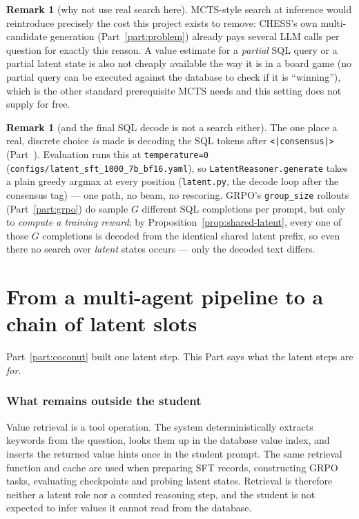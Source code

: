 \documentclass[11pt]{article}
\theoremstyle{definition}
\newtheorem{remark}[theorem]{Remark}
\begin{document}
\begin{remark}[why not use real search here]
MCTS-style search at inference would reintroduce precisely the cost this project exists to remove: CHESS's own multi-candidate generation (Part~\ref{part:problem}) already pays several LLM calls per question for exactly this reason. A value estimate for a \emph{partial} SQL query or a partial latent state is also not cheaply available the way it is in a board game (no partial query can be executed against the database to check if it is ``winning''), which is the other standard prerequisite MCTS needs and this setting does not supply for free.
\end{remark}

\begin{remark}[and the final SQL decode is not a search either]
The one place a real, discrete choice \emph{is} made is decoding the SQL tokens after \texttt{<|consensus|>} (Part~\ref{part:roles}). Evaluation runs this at \texttt{temperature=0} (\texttt{configs/latent\_sft\_1000\_7b\_bf16.yaml}), so \texttt{LatentReasoner.generate} takes a plain greedy argmax at every position (\texttt{latent.py}, the decode loop after the consensus tag) --- one path, no beam, no rescoring. GRPO's \texttt{group\_size} rollouts (Part~\ref{part:grpo}) do sample $G$ different SQL completions per prompt, but only to \emph{compute a training reward}; by Proposition~\ref{prop:shared-latent}, every one of those $G$ completions is decoded from the identical shared latent prefix, so even there no search over \emph{latent} states occurs --- only the decoded text differs.
\end{remark}

\newpage
\part{From a multi-agent pipeline to a chain of latent slots}
\label{part:roles}

Part~\ref{part:coconut} built one latent step. This Part says what the latent steps are \emph{for}.

\section{What remains outside the student}

Value retrieval is a tool operation. The system deterministically extracts keywords from the question, looks them up in the database value index, and inserts the returned value hints once in the student prompt. The same retrieval function and cache are used when preparing SFT records, constructing GRPO tasks, evaluating checkpoints and probing latent states. Retrieval is therefore neither a latent role nor a counted reasoning step, and the student is not expected to infer values it cannot read from the database.
\end{document}
